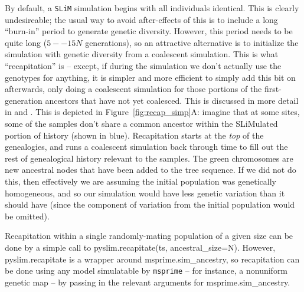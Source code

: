 \documentclass[12pt]{article}
\newcommand{\msprime}[0]{\texttt{msprime}\xspace}
\newcommand{\slim}[0]{\texttt{SLiM}\xspace}
\begin{document}
By default, a \slim simulation begins with all individuals identical.
This is clearly undesireable; the usual way to avoid after-effects of this
is to include a long ``burn-in'' period to generate genetic diversity.
However, this period needs to be quite long ($5--15N$ generations),
so an attractive alternative is to initialize the simulation
with genetic diversity from a coalescent simulation.
This is what ``recapitation'' is --
except, if during the simulation we don't actually use the genotypes for anything,
it is simpler and more efficient to simply add this bit on afterwards,
only doing a coalescent simulation for those portions of the first-generation ancestors
that have not yet coalesced.
This is discussed in more detail in \citet{kelleher} and \citet{slim_manual}.
This is depicted in Figure~\ref{fig:recap_simp}A:
imagine that at some sites, some of the samples
don't share a common ancestor within the SLiMulated portion of history (shown in blue).
Recapitation starts at the \textit{top} of the genealogies,
and runs a coalescent simulation back through time
to fill out the rest of genealogical history relevant to the samples.
The green chromosomes are new ancestral nodes that have been added to the tree sequence.
If we did not do this,
then effectively we are assuming the initial population was genetically homogeneous,
and so our simulation would have less genetic variation than it should have
(since the component of variation from the initial population would be omitted).

Recapitation within a single randomly-mating population of a given size
can be done by a simple call to
pyslim.recapitate(ts, ancestral\_size=N). %
However, pyslim.recapitate is a wrapper around
msprime.sim\_ancestry, so recapitation can be done using any model simulatable by \msprime
\citep{baumdicker} --
for instance, a nonuniform genetic map --
by passing in the relevant arguments for msprime.sim\_ancestry.
\end{document}
